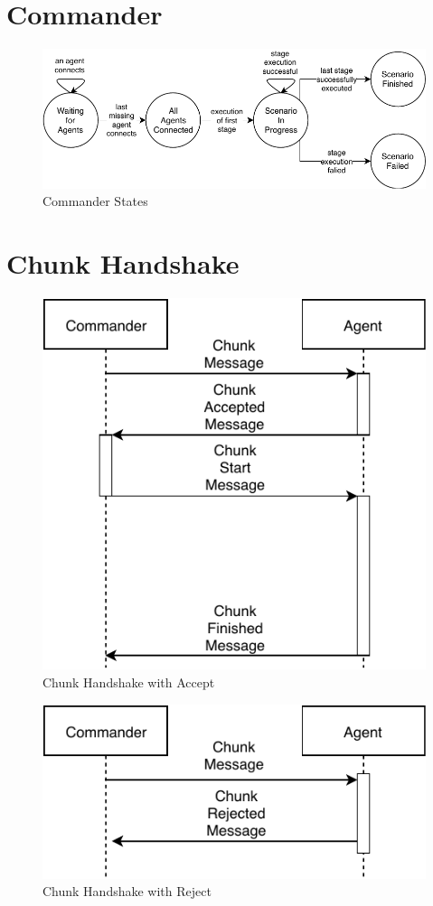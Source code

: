 \section{Commander}
\begin{figure}[h]
	\begin{center}
	\includegraphics[scale=1]{Resources/PDF/CommanderStates}
	\caption{Commander States}
	\label{pic:CommanderStates}
	\end{center}
\end{figure}

\section{Chunk Handshake}
\begin{figure}[h]
	\begin{center}
	\includegraphics[scale=1]{Resources/PDF/ChunkAcceptedHandshake}
	\caption{Chunk Handshake with Accept}
	\label{pic:ChunkAcceptedHandshake}
	\end{center}
\end{figure}

\begin{figure}[h]
	\begin{center}
	\includegraphics[scale=1]{Resources/PDF/ChunkRejectHandshake}
	\caption{Chunk Handshake with Reject}
	\label{pic:ChunkRejectHandshake}
	\end{center}
\end{figure}